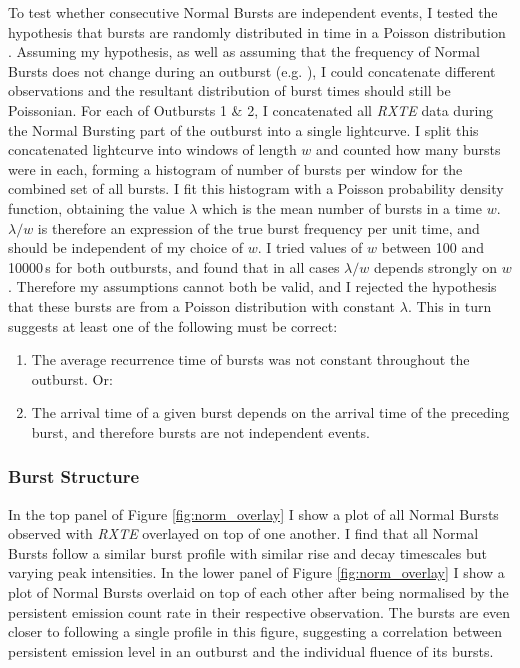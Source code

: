 \par To test whether consecutive Normal Bursts are independent events, I tested the hypothesis that bursts are randomly distributed in time in a Poisson distribution \citep{Poisson_Distribution}.  Assuming my hypothesis, as well as assuming that the frequency of Normal Bursts does not change during an outburst (e.g. \citealp{Aptekar_Recur}), I could concatenate different observations and the resultant distribution of burst times should still be Poissonian.  For each of Outbursts 1 \& 2, I concatenated all \indexrxte\textit{RXTE} data during the Normal Bursting part of the outburst into a single lightcurve.  I split this concatenated lightcurve into windows of length $w$ and counted how many bursts were in each, forming a histogram of number of bursts per window for the combined set of all bursts.  I fit this histogram with a Poisson probability density function, obtaining the value $\lambda$ which is the mean number of bursts in a time $w$.  $\lambda/w$ is therefore an expression of the true burst frequency per unit time, and should be independent of my choice of $w$.  I tried values of $w$ between 100 and 10000\,s for both outbursts, and found that in all cases $\lambda/w$ depends strongly on $w$.  Therefore my assumptions cannot both be valid, and I rejected the hypothesis that these bursts are from a Poisson distribution with constant $\lambda$.  This in turn suggests at least one of the following must be correct:
\begin{enumerate}
\item The average recurrence time of bursts was not constant throughout the outburst.  Or:
\item The arrival time of a given burst depends on the arrival time of the preceding burst, and therefore bursts are not independent events.
\end{enumerate}

\subsubsection{Burst Structure}

\label{sec:struc}

\par In the top panel of Figure \ref{fig:norm_overlay} I show a plot of all Normal Bursts observed with \indexrxte\textit{RXTE} overlayed on top of one another.  I find that all Normal Bursts follow a similar burst profile with similar rise and decay timescales but varying peak intensities.  In the lower panel of Figure \ref{fig:norm_overlay} I show a plot of Normal Bursts overlaid on top of each other after being normalised by the persistent emission count rate in their respective observation.  The bursts are even closer to following a single profile in this figure, suggesting a correlation between persistent emission level in an outburst and the individual fluence of its bursts.

